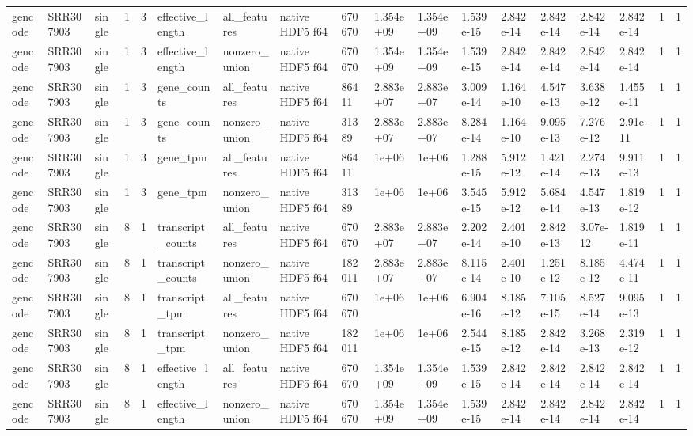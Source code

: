 \begin{tabular}{llllllllllllllllll}
gencode & SRR307903 & single & 1 & 3 & effective\_length & all\_features & native HDF5 f64 & 670670 & 1.354e+09 & 1.354e+09 & 1.539e-15 & 2.842e-14 & 2.842e-14 & 2.842e-14 & 2.842e-14 & 1 & 1 \\
gencode & SRR307903 & single & 1 & 3 & effective\_length & nonzero\_union & native HDF5 f64 & 670670 & 1.354e+09 & 1.354e+09 & 1.539e-15 & 2.842e-14 & 2.842e-14 & 2.842e-14 & 2.842e-14 & 1 & 1 \\
gencode & SRR307903 & single & 1 & 3 & gene\_counts & all\_features & native HDF5 f64 & 86411 & 2.883e+07 & 2.883e+07 & 3.009e-14 & 1.164e-10 & 4.547e-13 & 3.638e-12 & 1.455e-11 & 1 & 1 \\
gencode & SRR307903 & single & 1 & 3 & gene\_counts & nonzero\_union & native HDF5 f64 & 31389 & 2.883e+07 & 2.883e+07 & 8.284e-14 & 1.164e-10 & 9.095e-13 & 7.276e-12 & 2.91e-11 & 1 & 1 \\
gencode & SRR307903 & single & 1 & 3 & gene\_tpm & all\_features & native HDF5 f64 & 86411 & 1e+06 & 1e+06 & 1.288e-15 & 5.912e-12 & 1.421e-14 & 2.274e-13 & 9.911e-13 & 1 & 1 \\
gencode & SRR307903 & single & 1 & 3 & gene\_tpm & nonzero\_union & native HDF5 f64 & 31389 & 1e+06 & 1e+06 & 3.545e-15 & 5.912e-12 & 5.684e-14 & 4.547e-13 & 1.819e-12 & 1 & 1 \\
gencode & SRR307903 & single & 8 & 1 & transcript\_counts & all\_features & native HDF5 f64 & 670670 & 2.883e+07 & 2.883e+07 & 2.202e-14 & 2.401e-10 & 2.842e-13 & 3.07e-12 & 1.819e-11 & 1 & 1 \\
gencode & SRR307903 & single & 8 & 1 & transcript\_counts & nonzero\_union & native HDF5 f64 & 182011 & 2.883e+07 & 2.883e+07 & 8.115e-14 & 2.401e-10 & 1.251e-12 & 8.185e-12 & 4.474e-11 & 1 & 1 \\
gencode & SRR307903 & single & 8 & 1 & transcript\_tpm & all\_features & native HDF5 f64 & 670670 & 1e+06 & 1e+06 & 6.904e-16 & 8.185e-12 & 7.105e-15 & 8.527e-14 & 9.095e-13 & 1 & 1 \\
gencode & SRR307903 & single & 8 & 1 & transcript\_tpm & nonzero\_union & native HDF5 f64 & 182011 & 1e+06 & 1e+06 & 2.544e-15 & 8.185e-12 & 2.842e-14 & 3.268e-13 & 2.319e-12 & 1 & 1 \\
gencode & SRR307903 & single & 8 & 1 & effective\_length & all\_features & native HDF5 f64 & 670670 & 1.354e+09 & 1.354e+09 & 1.539e-15 & 2.842e-14 & 2.842e-14 & 2.842e-14 & 2.842e-14 & 1 & 1 \\
gencode & SRR307903 & single & 8 & 1 & effective\_length & nonzero\_union & native HDF5 f64 & 670670 & 1.354e+09 & 1.354e+09 & 1.539e-15 & 2.842e-14 & 2.842e-14 & 2.842e-14 & 2.842e-14 & 1 & 1 \\

\end{tabular}
